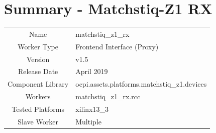 \documentclass{article}
\author{} %
\date{Version \docVersion} %
\title{\docTitle}
\def\docVersion{1.5}
\def\comp{matchstiq\_z1\_rx}
\def\Comp{Matchstiq-Z1 RX}
\begin{document}
\section*{Summary - \Comp}
\begin{tabular}{|c|M{13.5cm}|}
	\hline
	                  &                                        \\
	\hline
	Name              & \comp                                  \\
	\hline
	Worker Type       & Frontend Interface (Proxy)             \\
	\hline
	Version           & v\docVersion \\
	\hline
	Release Date      & April 2019 \\
	\hline
	Component Library & ocpi.assets.platforms.matchstiq\_z1.devices \\
	\hline
	Workers           & matchstiq\_z1\_rx.rcc                      \\
	\hline
	Tested Platforms  & xilinx13\_3 \\
	\hline
	Slave Worker      & Multiple                               \\
	\hline
\end{tabular}
\end{document}
